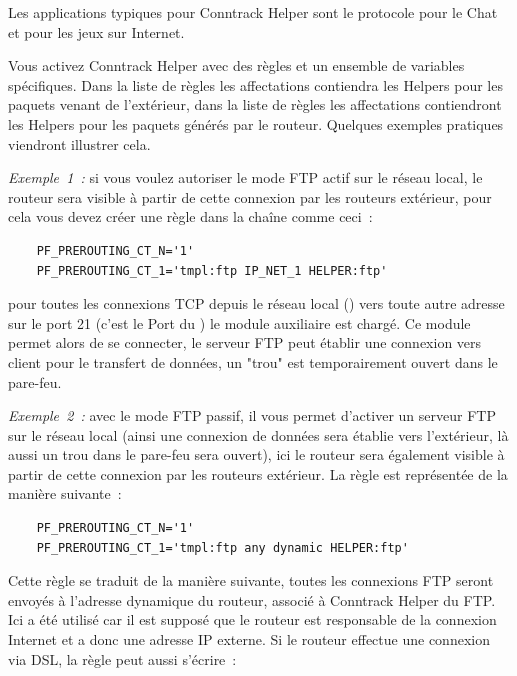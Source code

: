  Les applications typiques pour Conntrack Helper sont le protocole pour le Chat
  et pour les jeux sur Internet.

  Vous activez Conntrack Helper avec des règles et un ensemble de variables
  spécifiques. Dans la liste de règles  les
  affectations contiendra les Helpers pour les paquets venant de l'extérieur,
  dans la liste de règles  les affectations contiendront
  les Helpers pour les paquets générés par le routeur. Quelques exemples
  pratiques viendront illustrer cela.

\emph{Exemple~1~:} si vous voulez autoriser le mode FTP actif sur le réseau
  local, le routeur sera visible à partir de cette connexion par les routeurs
  extérieur, pour cela vous devez créer une règle dans la chaîne
   comme ceci~:

\begin{example}
\begin{verbatim}
    PF_PREROUTING_CT_N='1'
    PF_PREROUTING_CT_1='tmpl:ftp IP_NET_1 HELPER:ftp'
\end{verbatim}
\end{example}

  pour toutes les connexions TCP depuis le réseau local () vers
  toute autre adresse sur le port 21 (c'est le Port du ) le module
  auxiliaire  est chargé. Ce module permet alors de se connecter,
  le serveur FTP peut établir une connexion vers client pour le transfert de
  données, un "trou" est temporairement ouvert dans le pare-feu.

  \emph{Exemple~2~:} avec le mode FTP passif, il vous permet d'activer un
  serveur FTP sur le réseau local (ainsi une connexion de données sera établie
  vers l'extérieur, là aussi un trou dans le pare-feu sera ouvert), ici le
  routeur sera également visible à partir de cette connexion par les routeurs
  extérieur. La règle est représentée de la manière suivante~:

\begin{example}
\begin{verbatim}
    PF_PREROUTING_CT_N='1'
    PF_PREROUTING_CT_1='tmpl:ftp any dynamic HELPER:ftp'
\end{verbatim}
\end{example}

Cette règle se traduit de la manière suivante, toutes les connexions FTP seront
envoyés à l'adresse dynamique du routeur, associé à Conntrack Helper du FTP. Ici
 a été utilisé car il est supposé que le routeur est
responsable de la connexion Internet et a donc une adresse IP externe. Si le
routeur effectue une connexion via DSL, la règle peut aussi s'écrire~:

